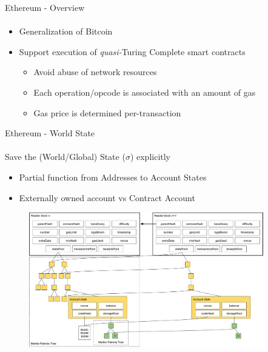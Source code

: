 \begin{frame}{Ethereum - Overview}
\framesubtitle{\cite{bib:yellow}}
\begin{itemize}
\item Generalization of Bitcoin
\item Support execution of \emph{quasi-}Turing Complete smart contracts
\begin{itemize}
\item Avoid abuse of network resources
\item Each operation/opcode is associated with
an amount of gas %
\item Gas price is determined per-transaction
\end{itemize}
\end{itemize}
\end{frame}

\begin{frame}{Ethereum - World State}
\framesubtitle{\cite{bib:yellow}}
	 Save the (World/Global) State ($\sigma$) explicitly
     \begin{itemize}
     \item Partial function from Addresses to Account States
     \item Externally owned account vs Contract Account
    \end{itemize}	
	 
    \begin{figure}
        \begin{center}
            \includegraphics[width=0.91\textwidth]{./img/world-state}
        \end{center}
    \end{figure}
\end{frame}

